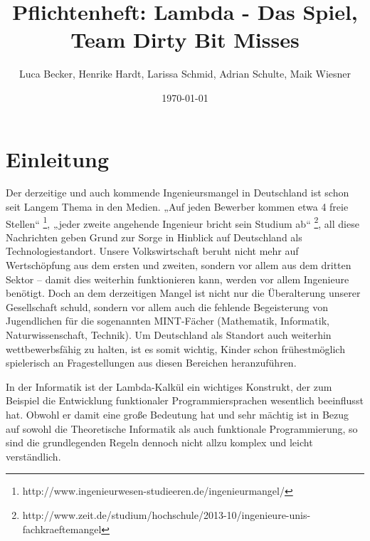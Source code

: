 \documentclass{scrartcl}
\begin{document}
\begin{titlepage}

\title{Pflichtenheft: Lambda - Das Spiel, Team Dirty Bit Misses}
\author{Luca Becker, Henrike Hardt, Larissa Schmid, Adrian Schulte, Maik Wiesner}
\date{\today}

\maketitle
\thispagestyle{empty}

\end{titlepage}

\clearpage

\tableofcontents
\thispagestyle{empty}

\clearpage
\setcounter{page}{1}







\section{Einleitung}

Der derzeitige und auch kommende Ingenieursmangel in Deutschland ist
schon seit Langem Thema in den Medien. „Auf jeden Bewerber kommen
etwa 4 freie Stellen“%
\footnote{http://www.ingenieurwesen-studieeren.de/ingenieurmangel/%
}, „jeder zweite angehende Ingenieur bricht sein Studium ab“%
\footnote{http://www.zeit.de/studium/hochschule/2013-10/ingenieure-unis-fachkraeftemangel%
}, all diese Nachrichten geben Grund zur Sorge in Hinblick auf Deutschland
als Technologiestandort. Unsere Volkswirtschaft beruht nicht mehr
auf Wertschöpfung aus dem ersten und zweiten, sondern vor allem aus
dem dritten Sektor – damit dies weiterhin funktionieren kann, werden
vor allem Ingenieure benötigt. Doch an dem derzeitigen Mangel ist
nicht nur die Überalterung unserer Gesellschaft schuld, sondern vor
allem auch die fehlende Begeisterung von Jugendlichen für die sogenannten
MINT-Fächer (Mathematik, Informatik, Naturwissenschaft, Technik).
Um Deutschland als Standort auch weiterhin wettbewerbsfähig zu halten,
ist es somit wichtig, Kinder schon frühestmöglich spielerisch an Fragestellungen
aus diesen Bereichen heranzuführen. 

In der Informatik ist der Lambda-Kalkül ein wichtiges Konstrukt, der
zum Beispiel die Entwicklung funktionaler Programmiersprachen wesentlich
beeinflusst hat. Obwohl er damit eine große Bedeutung hat und sehr
mächtig ist in Bezug auf sowohl die Theoretische Informatik als auch
funktionale Programmierung, so sind die grundlegenden Regeln dennoch
nicht allzu komplex und leicht verständlich. 
\end{document}
